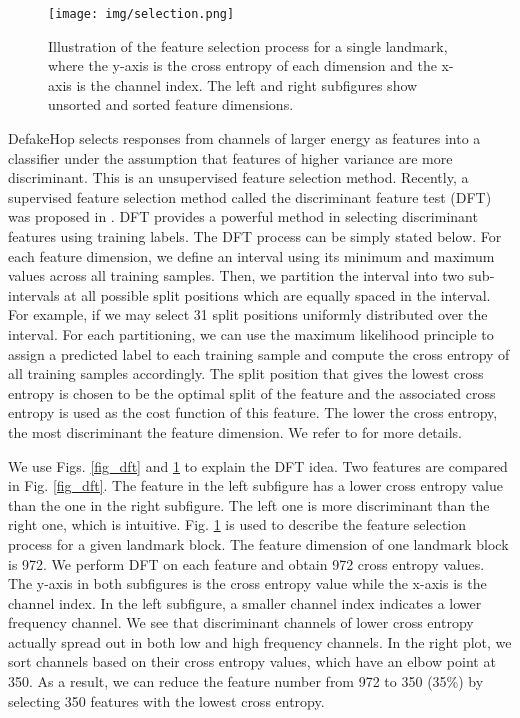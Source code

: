 \documentclass[main, biber]{now-journal}
\begin{document}
\begin{figure}[!t]
\centering
\texttt{[image: img/selection.png]}
\caption{Illustration of the feature selection process for a single
landmark, where the y-axis is the cross entropy of each dimension and
the x-axis is the channel index. The left and right subfigures show
unsorted and sorted feature dimensions.}\label{fig_selection}
\end{figure}

DefakeHop selects responses from channels of larger energy as features
into a classifier under the assumption that features of higher variance
are more discriminant. This is an unsupervised feature selection method.
Recently, a supervised feature selection method called the discriminant
feature test (DFT) was proposed in \citep{yang2022supervised}. DFT
provides a powerful method in selecting discriminant features using training
labels. The DFT process can be simply stated below. For each feature
dimension, we define an interval using its minimum and maximum values
across all training samples. Then, we partition the interval into two
sub-intervals at all possible split positions which are equally spaced
in the interval. For example, if we may select 31 split positions
uniformly distributed over the interval. For each partitioning, we can
use the maximum likelihood principle to assign a predicted label to each
training sample and compute the cross entropy of all training samples
accordingly. The split position that gives the lowest cross entropy is
chosen to be the optimal split of the feature and the associated
cross entropy is used as the cost function of this feature. The lower
the cross entropy, the most discriminant the feature dimension. We refer
to \citep{yang2022supervised} for more details.

We use Figs. \ref{fig_dft} and \ref{fig_selection} to explain the DFT
idea. Two features are compared in Fig. \ref{fig_dft}. The feature in
the left subfigure has a lower cross entropy value than the one in the
right subfigure. The left one is more discriminant than the right one,
which is intuitive.  Fig. \ref{fig_selection} is used to describe the
feature selection process for a given landmark block. The feature
dimension of one landmark block is 972. We perform DFT on each feature
and obtain 972 cross entropy values. The y-axis in both subfigures is
the cross entropy value while the x-axis is the channel index. In the
left subfigure, a smaller channel index indicates a lower frequency
channel. We see that discriminant channels of lower cross entropy
actually spread out in both low and high frequency channels. In the
right plot, we sort channels based on their cross entropy values, which
have an elbow point at 350. As a result, we can reduce the feature
number from 972 to 350 (35\%) by selecting 350 features with the lowest
cross entropy. 
\end{document}
